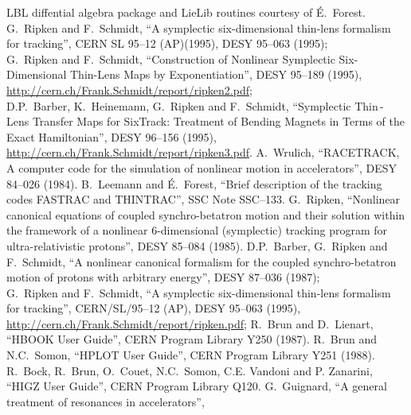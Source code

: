 \begin{thebibliography}{99}
        LBL diffential algebra package and LieLib routines courtesy of \'{E}.~Forest. 
        G.~Ripken and F.~Schmidt,
        ``A symplectic six-dimensional thin-lens formalism for tracking'',
        CERN SL 95--12 (AP)(1995), DESY 95--063 (1995);\\
        G.~Ripken and F.~Schmidt,
        ``Construction of Nonlinear Symplectic Six-Dimensional Thin-Lens Maps by Exponentiation'',
        DESY 95--189 (1995), \url{http://cern.ch/Frank.Schmidt/report/ripken2.pdf};\\
        D.P.~Barber, K.~Heinemann, G.~Ripken and F.~Schmidt,
        ``Symplectic Thin\,-\,Lens Transfer Maps for SixTrack: Treatment of  Bending Magnets in Terms of the Exact Hamiltonian'',
        DESY 96--156 (1995), \url{http://cern.ch/Frank.Schmidt/report/ripken3.pdf}.  
        A.~Wrulich,
        ``RACETRACK, A computer code for the simulation of nonlinear motion in accelerators'',
        DESY 84--026 (1984).  
        B.~Leemann and \'{E}.~Forest,
        ``Brief description of the tracking codes FASTRAC and THINTRAC'',
        SSC Note SSC--133.  
        G.~Ripken,
        ``Nonlinear canonical equations of coupled synchro-betatron motion and their solution within the framework of a nonlinear 6-dimensional (symplectic) tracking program for ultra-relativistic protons'',
        DESY 85--084 (1985).  
        D.P.~Barber, G.~Ripken and F.~Schmidt,
        ``A nonlinear canonical formalism for the coupled synchro-betatron motion of protons with arbitrary energy'',
        DESY 87--036 (1987);\\
        G.~Ripken and F.~Schmidt,
        ``A symplectic six-dimensional thin-lens formalism for tracking'',
        CERN/SL/95--12 (AP), DESY 95--063 (1995), \url{http://cern.ch/Frank.Schmidt/report/ripken.pdf};
        R.~Brun and D.~Lienart,
        ``HBOOK User Guide'',
        CERN Program Library Y250 (1987).  
        R.~Brun and N.C.~Somon,
        ``HPLOT User Guide'',
        CERN Program Library Y251 (1988).  
        R.~Bock, R.~Brun, O.~Couet, N.C.~Somon, C.E. Vandoni and P. Zanarini,
        ``HIGZ User Guide'',
        CERN Program Library Q120.  
        G.~Guignard,
        ``A general treatment of resonances in accelerators'',

\end{thebibliography}
